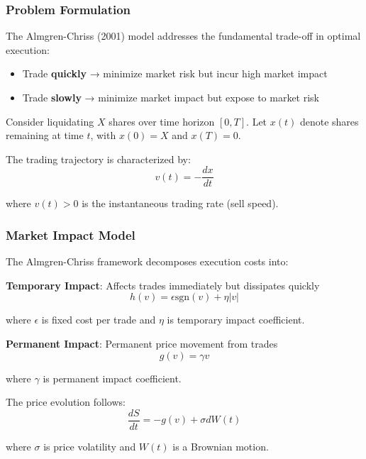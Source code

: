 \documentclass[11pt,a4paper]{article}
\begin{document}
\subsubsection{Problem Formulation}

The Almgren-Chriss (2001) model addresses the fundamental trade-off in optimal execution:
\begin{itemize}
    \item Trade \textbf{quickly} → minimize market risk but incur high market impact
    \item Trade \textbf{slowly} → minimize market impact but expose to market risk
\end{itemize}

Consider liquidating $X$ shares over time horizon $[0, T]$. Let $x(t)$ denote shares remaining at time $t$, with $x(0) = X$ and $x(T) = 0$.

The trading trajectory is characterized by:
\begin{equation}
v(t) = -\frac{dx}{dt}
\end{equation}

where $v(t) > 0$ is the instantaneous trading rate (sell speed).

\subsubsection{Market Impact Model}

The Almgren-Chriss framework decomposes execution costs into:

\textbf{Temporary Impact}: Affects trades immediately but dissipates quickly
\begin{equation}
h(v) = \epsilon \text{sgn}(v) + \eta |v|
\end{equation}

where $\epsilon$ is fixed cost per trade and $\eta$ is temporary impact coefficient.

\textbf{Permanent Impact}: Permanent price movement from trades
\begin{equation}
g(v) = \gamma v
\end{equation}

where $\gamma$ is permanent impact coefficient.

The price evolution follows:
\begin{equation}
\frac{dS}{dt} = -g(v) + \sigma dW(t)
\end{equation}

where $\sigma$ is price volatility and $W(t)$ is a Brownian motion.
\end{document}
